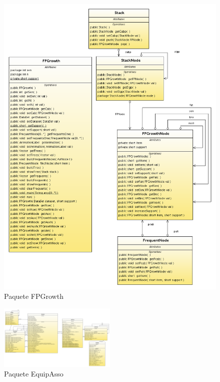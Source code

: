 \begin{figure}[ht]
\centering
\includegraphics[width=1.0\textwidth]{imgsClases/FPGrowth.png}
\caption{Paquete FPGrowth}
\end{figure}
\newpage
\begin{figure}[ht]
\centering
\includegraphics[angle=90, width=0.5\textwidth]{imgsClases/EquipAsso.png}
\caption{Paquete EquipAsso}
\end{figure}
\newpage
